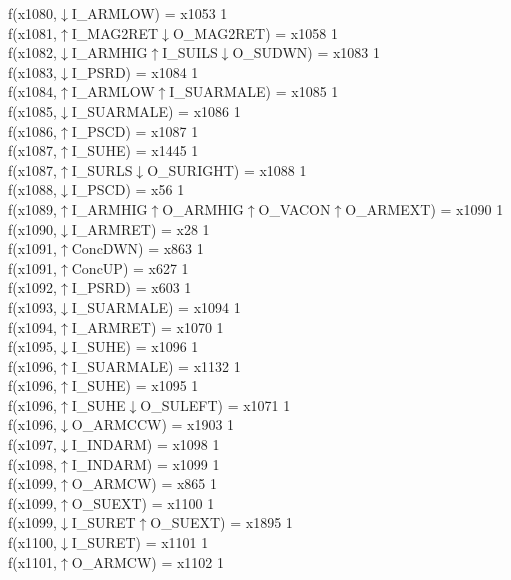 f(x1080,$\downarrow$I\_ARMLOW) = x1053 {1} \\
f(x1081,$\uparrow$I\_MAG2RET$\downarrow$O\_MAG2RET) = x1058 {1} \\
f(x1082,$\downarrow$I\_ARMHIG$\uparrow$I\_SUILS$\downarrow$O\_SUDWN) = x1083 {1} \\
f(x1083,$\downarrow$I\_PSRD) = x1084 {1} \\
f(x1084,$\uparrow$I\_ARMLOW$\uparrow$I\_SUARMALE) = x1085 {1} \\
f(x1085,$\downarrow$I\_SUARMALE) = x1086 {1} \\
f(x1086,$\uparrow$I\_PSCD) = x1087 {1} \\
f(x1087,$\uparrow$I\_SUHE) = x1445 {1} \\
f(x1087,$\uparrow$I\_SURLS$\downarrow$O\_SURIGHT) = x1088 {1} \\
f(x1088,$\downarrow$I\_PSCD) = x56 {1} \\
f(x1089,$\uparrow$I\_ARMHIG$\uparrow$O\_ARMHIG$\uparrow$O\_VACON$\uparrow$O\_ARMEXT) = x1090 {1} \\
f(x1090,$\downarrow$I\_ARMRET) = x28 {1} \\
f(x1091,$\uparrow$ConcDWN) = x863 {1} \\
f(x1091,$\uparrow$ConcUP) = x627 {1} \\
f(x1092,$\uparrow$I\_PSRD) = x603 {1} \\
f(x1093,$\downarrow$I\_SUARMALE) = x1094 {1} \\
f(x1094,$\uparrow$I\_ARMRET) = x1070 {1} \\
f(x1095,$\downarrow$I\_SUHE) = x1096 {1} \\
f(x1096,$\uparrow$I\_SUARMALE) = x1132 {1} \\
f(x1096,$\uparrow$I\_SUHE) = x1095 {1} \\
f(x1096,$\uparrow$I\_SUHE$\downarrow$O\_SULEFT) = x1071 {1} \\
f(x1096,$\downarrow$O\_ARMCCW) = x1903 {1} \\
f(x1097,$\downarrow$I\_INDARM) = x1098 {1} \\
f(x1098,$\uparrow$I\_INDARM) = x1099 {1} \\
f(x1099,$\uparrow$O\_ARMCW) = x865 {1} \\
f(x1099,$\uparrow$O\_SUEXT) = x1100 {1} \\
f(x1099,$\downarrow$I\_SURET$\uparrow$O\_SUEXT) = x1895 {1} \\
f(x1100,$\downarrow$I\_SURET) = x1101 {1} \\
f(x1101,$\uparrow$O\_ARMCW) = x1102 {1} \\
